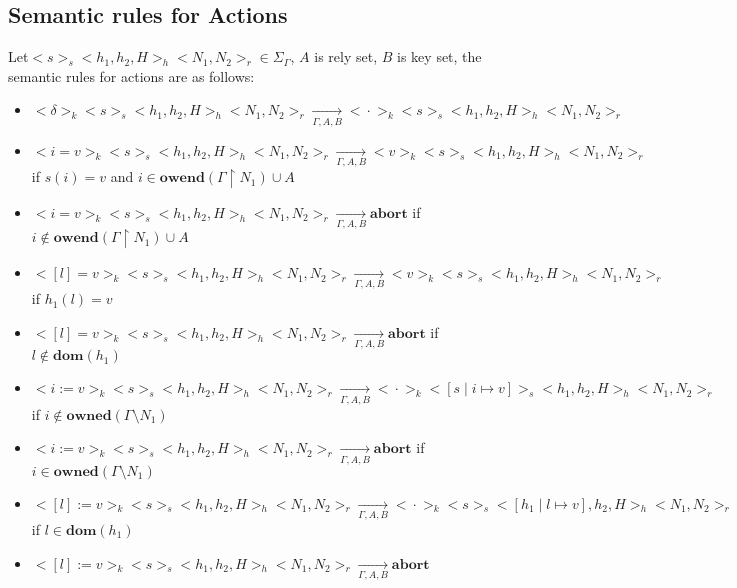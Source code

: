 \documentclass{lmcs} %
\theoremstyle{plain}\newtheorem{satz}[thm]{Satz} %
\begin{document}
\subsection*{Semantic rules for Actions}
Let$<\!\!s\!\!>_s<\!\!h_1,h_2,H\!\!>_h<\!\!N_1,N_2\!\!>_r\in \Sigma_\Gamma$, $A$ is rely set, $B$ is key set, the semantic rules for actions are as follows:
\begin{itemize}
\item $<\!\!\delta\!\!>_k<\!\!s\!\!>_s<\!\!h_1,h_2,H\!\!>_h<\!\!N_1,N_2\!\!>_r\xrightarrow[\Gamma, A,B]{}<\!\!\cdot\!\!>_k<\!\!s\!\!>_s<\!\!h_1,h_2,H\!\!>_h<\!\!N_1,N_2\!\!>_r$
\item $<\!\!i=v\!\!>_k<\!\!s\!\!>_s<\!\!h_1,h_2,H\!\!>_h<\!\!N_1,N_2\!\!>_r\xrightarrow[\Gamma, A,B]{}<\!\!v\!\!>_k<\!\!s\!\!>_s<\!\!h_1,h_2,H\!\!>_h<\!\!N_1,N_2\!\!>_r$\\
   if $s(i)=v$\;\; and\;\; $i\in \mathbf{owend}(\Gamma\upharpoonright N_1)\cup A$
\item $<\!\!i=v\!\!>_k<\!\!s\!\!>_s<\!\!h_1,h_2,H\!\!>_h<\!\!N_1,N_2\!\!>_r\xrightarrow[\Gamma, A,B]{}\mathbf{abort}$ \;\;
   if $i\notin \mathbf{owend}(\Gamma\upharpoonright N_1)\cup A$
\item $<\!\![l]=v\!\!>_k<\!\!s\!\!>_s<\!\!h_1,h_2,H\!\!>_h<\!\!N_1,N_2\!\!>_r\xrightarrow[\Gamma, A, B]{}<\!\!v\!\!>_k<\!\!s\!\!>_s<\!\!h_1,h_2,H\!\!>_h<\!\!N_1,N_2\!\!>_r$\\
if $h_1(l)=v$
\item $<\!\![l]=v\!\!>_k<\!\!s\!\!>_s<\!\!h_1,h_2,H\!\!>_h<\!\!N_1,N_2\!\!>_r\xrightarrow[\Gamma, A, B]{}\mathbf{abort}$\;\;
if $l\notin \mathbf{dom}(h_1)$
\item $<\!\!i:=v\!\!>_k<\!\!s\!\!>_s<\!\!h_1,h_2,H\!\!>_h<\!\!N_1,N_2\!\!>_r\xrightarrow[\Gamma, A, B]{}<\!\!\cdot\!\!>_k<\!\![s\mid i\mapsto v]\!\!>_s<\!\!h_1,h_2,H\!\!>_h<\!\!N_1,N_2\!\!>_r$\\
if $i\notin \mathbf{owned}(\Gamma \setminus N_1)$
\item $<\!\!i:=v\!\!>_k<\!\!s\!\!>_s<\!\!h_1,h_2,H\!\!>_h<\!\!N_1,N_2\!\!>_r\xrightarrow[\Gamma, A, B]{} \mathbf{abort}$\;\;
if $i\in \mathbf{owned}(\Gamma \setminus N_1)$
\item $<\!\![l]:=v\!\!>_k<\!\!s\!\!>_s<\!\!h_1,h_2,H\!\!>_h<\!\!N_1,N_2\!\!>_r\xrightarrow[\Gamma, A, B]{}<\!\!\cdot\!\!>_k<\!\!s\!\!>_s<\!\![h_1\mid l\mapsto v],h_2,H\!\!>_h<\!\!N_1,N_2\!\!>_r$\;\;\;\;\;\;
if $l\in \mathbf{dom}(h_1)$
\item $<\!\![l]:=v\!\!>_k<\!\!s\!\!>_s<\!\!h_1,h_2,H\!\!>_h<\!\!N_1,N_2\!\!>_r\xrightarrow[\Gamma, A, B]{}\mathbf{abort}$ \;\;

\end{itemize}
\end{document}
